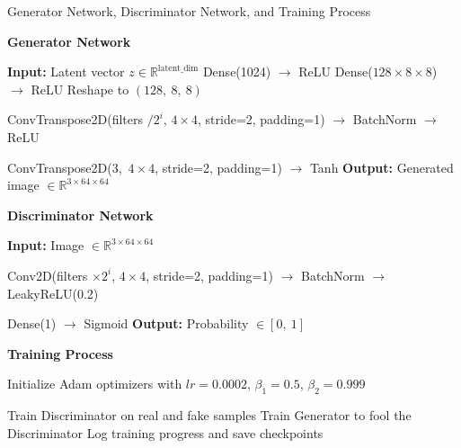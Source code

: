 \begin{algorithm}
\caption{Generator Network, Discriminator Network, and Training Process}
\label{alg:gan}
\noindent\textbf{Generator Network}
\begin{algorithmic}[1]

\State \textbf{Input:} Latent vector $z \in \mathbb{R}^{\text{latent\_dim}}$
\State Dense(1024) $\rightarrow$ ReLU
\State Dense($128 \times 8 \times 8$) $\rightarrow$ ReLU
\State Reshape to $(128,\ 8,\ 8)$

    \State ConvTranspose2D(filters $/ 2^i$, $4 \times 4$, stride=2, padding=1)
    \State \hspace{2em}$\rightarrow$ BatchNorm $\rightarrow$ ReLU
\EndFor

\State ConvTranspose2D(3,\ $4 \times 4$, stride=2, padding=1) $\rightarrow$ Tanh
\State \textbf{Output:} Generated image $\in \mathbb{R}^{3 \times 64 \times 64}$

\end{algorithmic}

\vspace{1em}
\noindent\textbf{Discriminator Network}
\begin{algorithmic}[1]

\State \textbf{Input:} Image $\in \mathbb{R}^{3 \times 64 \times 64}$

    \State Conv2D(filters $\times 2^i$, $4 \times 4$, stride=2, padding=1)
    \State \hspace{2em}$\rightarrow$ BatchNorm $\rightarrow$ LeakyReLU(0.2)
\EndFor

\State Dense(1) $\rightarrow$ Sigmoid
\State \textbf{Output:} Probability $\in [0,\ 1]$

\end{algorithmic}

\vspace{1em}
\noindent\textbf{Training Process}
\begin{algorithmic}[1]

\State Initialize Adam optimizers with $lr = 0.0002$, $\beta_1 = 0.5$, $\beta_2 = 0.999$

        \State Train Discriminator on real and fake samples
        \State Train Generator to fool the Discriminator
        \State Log training progress and save checkpoints
    \EndFor
\EndFor

\end{algorithmic}
\end{algorithm}
